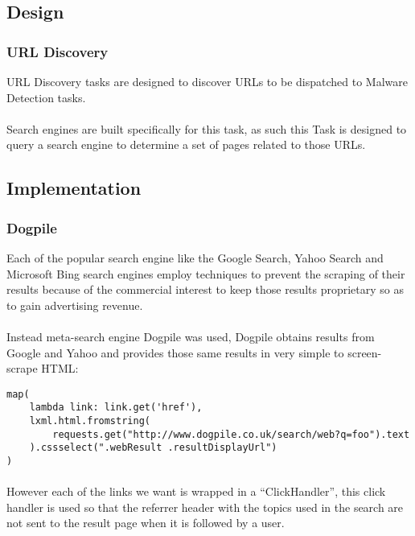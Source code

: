 \subsection{Design}
\subsubsection{URL Discovery}
URL Discovery tasks are designed to discover URLs to be dispatched to Malware Detection tasks.

\paragraph{}
Search engines are built specifically for this task, as such this Task is designed to query a search engine to determine a set of pages related to those URLs.

\subsection{Implementation}
\subsubsection{Dogpile}
Each of the popular search engine like the Google Search, Yahoo Search and Microsoft Bing search engines employ techniques to prevent the scraping of their results because of the commercial interest to keep those results proprietary so as to gain advertising revenue.

\paragraph{}
Instead meta-search engine Dogpile was used, Dogpile obtains results from Google and Yahoo and provides those same results in very simple to screen-scrape HTML\cite{screen-scrape}:

\begin{verbatim}
map(
    lambda link: link.get('href'),
    lxml.html.fromstring(
        requests.get("http://www.dogpile.co.uk/search/web?q=foo").text
    ).cssselect(".webResult .resultDisplayUrl")
)
\end{verbatim}

\paragraph{}
However each of the links we want is wrapped in a ``ClickHandler'', this click handler is used so that the referrer header with the topics used in the search are not sent to the result page when it is followed by a user.

